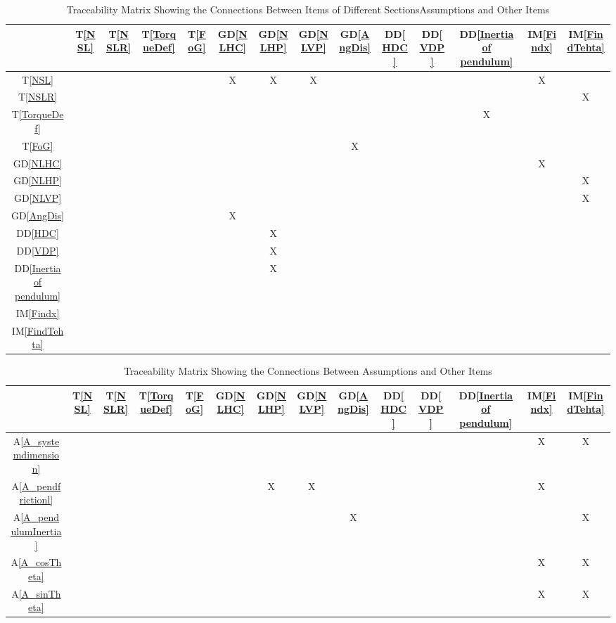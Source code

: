 \documentclass[12pt]{article}
\newcommand{\dref}[1]{GD\ref{#1}}
\newcommand{\ddref}[1]{DD\ref{#1}}
\newcommand{\tref}[1]{T\ref{#1}}
\newcommand{\aref}[1]{A\ref{#1}}
\newcommand{\iref}[1]{IM\ref{#1}}
\begin{document}
\begin{landscape}
\begin{table}[h!]
\centering
\begin{tabular}{|c|c|c|c|c|c|c|c|c|c|c|c|c|c|}
\hline
	& \tref{NSL}&\tref{NSLR}&\tref{TorqueDef}&\tref{FoG}& \dref{NLHC}& \dref{NLHP}& \dref{NLVP}& \dref{AngDis}& \ddref{HDC}&\ddref{VDP}&\ddref{Inertia of pendulum} &\iref{Findx}&\iref{FindTehta}\\
\hline
\tref{NSL}    & & & & &X &X &X & & & & &X &\\ \hline
\tref{NSLR}    & & & & & & & & & & & & &X\\ \hline
\tref{TorqueDef}    & & & & & & & & & & &X & &\\ \hline
\tref{FoG}    & & & & & & & & X& & & & &\\ \hline
\dref{NLHC}  & & & & & & & & & & & &X & \\ \hline
\dref{NLHP}  & & & & & & & & & & & & &X\\ \hline
\dref{NLVP}  & & & & & & & & & & & & &X\\ \hline
\dref{AngDis}& & & & & X& & & & & & & & \\ \hline
\ddref{HDC}  & & & & & & X& & & & & & & \\ \hline
\ddref{VDP}  & & & & & & X& & & && & & \\ \hline
\ddref{Inertia of pendulum}       & & & & & & X& & & & & & &\\ \hline
\iref{Findx}  & & & & & & & & & & & & &\\ \hline
\iref{FindTehta} & & & & & & & & & & & & &\\ \hline
\hline
\end{tabular}
\caption{Traceability Matrix Showing the Connections Between Items of Different SectionsAssumptions and Other Items}
\label{Table:trace}
\end{table}
\end{landscape}




\begin{table}[h!]
\centering
\begin{tabular}{|c|c|c|c|c|c|c|c|c|c|c|c|c|c|}
\hline        
	& \tref{NSL}&\tref{NSLR}&\tref{TorqueDef}&\tref{FoG}& \dref{NLHC}& \dref{NLHP}& \dref{NLVP}& \dref{AngDis}& \ddref{HDC}&\ddref{VDP}&\ddref{Inertia of pendulum} &\iref{Findx}&\iref{FindTehta}\\
\hline
\aref{A_systemdimension}      & & & & & & & & & & & &X &X\\ \hline
\aref{A_pendfrictionl}        & & & & & &X &X & & & & &X &\\ \hline
\aref{A_pendulumInertia}      & & & & & & & &X & & & & & X\\ \hline
\aref{A_cosTheta}             & & & & & & & & & & & & X& X\\ \hline
\aref{A_sinTheta}             & & & & & & & & & & & & X& X\\ \hline

\hline
\end{tabular}
\caption{Traceability Matrix Showing the Connections Between Assumptions and Other Items}
\label{Table:A_trace}
\end{table}
\end{document}
